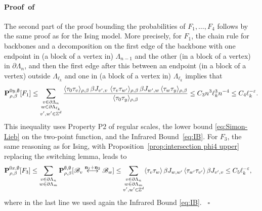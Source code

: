 \documentclass[a4paper,oneside,11pt]{article}
\def\Z{\mathbb{Z}}                          %
\numberwithin{equation}{section}
\numberwithin{equation}{section}
\numberwithin{equation}{section}
\newenvironment{proof}[1][\relax]%
  {\paragraph{Proof\ifx#1\relax\else~of #1\fi}}%
  {~\hfill$\square$\par\bigskip}
\newcommand{\calB}{\mathcal{B}}
\def\Z{\mathbb{Z}}                          %
\newcommand{\ep}{\varepsilon}
\newcommand{\n}{\mathbf{n}}
\begin{document}
\begin{proof}
The second part of the proof bounding the probabilities of $F_1,\dots,F_4$ follows by the same proof as for the Ising model. More precisely,
for $F_1$, the chain rule for backbones \cite{AizBarFer87} and a decomposition on the first edge of the backbone with one endpoint in (a block of a vertex in) $\Lambda_{n-1}$ and the other (in a block of a vertex) in $\partial\Lambda_n$, and then the first edge after this between an endpoint (in a block of a vertex) outside $\Lambda_{\ell_k}$ and one in (a block of a vertex in)  $\Lambda_{\ell_{k}}$ implies that
\begin{equation}{\bf P}^{0y,\emptyset}_{\rho,\beta}[F_1]\le \sum_{\substack{v\in \partial\Lambda_{n}\\w\in \partial\Lambda_{\ell_{k}}\\ v',w'\in\Z^d}}\frac{\langle\tau_0\tau_v\rangle_{\rho,\beta}\,\beta J_{v',v}\ \langle\tau_{v}\tau_{w'}\rangle_{\rho,\beta}\,\beta J_{w',w}\,\langle\tau_{w}\tau_y\rangle_{\rho,\beta}}{\langle\tau_0\tau_y\rangle_{\rho,\beta}}\le C_3 n^3\ell_{k}^3 n^{-4}\le C_4\ell_{k}^{-\ep}.\end{equation}
This inequality uses Property P2 of regular scales, the lower bound \eqref{eq:Simon-Lieb} on the two-point function, and the Infrared Bound~\eqref{eq:IB}.
For $F_3$, the same reasoning as for Ising, with Proposition~\ref{prop:intersection phi4 upper} replacing the switching lemma, leads to \begin{align}
{\bf P}^{0x,\emptyset}_{\rho,\beta}[F_3]&\le \sum_{\substack{v\in \partial\Lambda_{n}\\ w\in\partial\Lambda_m}}{\bf P}^{\emptyset,\emptyset}_{\rho,\beta}[\calB_v\stackrel{\n_1+\n_2}{\longleftrightarrow} \calB_w]\le \sum_{\substack{v\in \partial\Lambda_{n}\\ w\in\partial\Lambda_m\\ v',w'\in\Z^d}}\langle\tau_v\tau_w\rangle\,\beta J_{w,w'}\,\langle\tau_{w'}\tau_{v'}\rangle\,\beta J_{v',v}\le C_5\ell_{k}^{-\ep},\end{align}
where in the last line we used again the Infrared Bound \eqref{eq:IB}. \end{proof}
\end{document}
